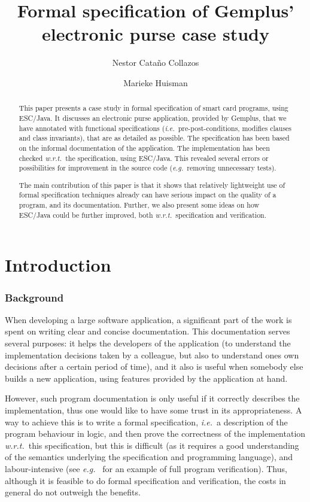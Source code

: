 \documentclass[a4paper]{llncs}
\title{Formal specification of Gemplus' electronic purse case study}
\author{
  Nestor Cata\~no Collazos
\and
  Marieke Huisman
}
\institute{
  INRIA Sophia-Antipolis, France \\ 
  \email{\{Nestor.Catano, Marieke.Huisman\}@sophia.inria.fr}
}
\begin{document}
%

\maketitle


\begin{abstract}
This paper presents a case study in formal specification of smart card
programs, using ESC/Java. It discusses an electronic purse
application, provided by Gemplus, that we have annotated with
functional specifications (\emph{i.e.}~pre-post-conditions, modifies
clauses and class invariants), that are as detailed as possible. The
specification has been based on the informal documentation of the
application. The implementation has been checked \emph{w.r.t.}~the
specification, using ESC/Java.  This revealed several errors or
possibilities for improvement in the source code (\emph{e.g.}~removing
unnecessary tests).

The main contribution of this paper is that it shows that relatively
lightweight use of formal specification techniques already can have
serious impact on the quality of a program, and its
documentation. Further, we also present some ideas on how ESC/Java
could be further improved, both
\emph{w.r.t.}~specification and verification.
\end{abstract}

\section{Introduction}
\label{SectIntro}

\subsubsection{Background}
When developing a large software application, a significant part of
the work is spent on writing clear and concise documentation. This
documentation serves several purposes: it helps the developers of the
application (to understand the implementation decisions taken by a
colleague, but also to understand ones own decisions after a certain
period of time), and it also is useful when somebody else builds a new
application, using features provided by the application at hand.

However, such program documentation is only useful if it correctly
describes the implementation, thus one would like to have some trust
in its appropriateness. A way to achieve this is to write a formal
specification, \emph{i.e.}~a description of the program behaviour in
logic, and then prove the correctness of the implementation
\emph{w.r.t.}~this specification, but this is difficult (as it
requires a good understanding of the semantics underlying the
specification and programming language), and labour-intensive (see
\emph{e.g.}~\cite{HuismanJB00a} for an example of full program
verification). Thus, although it is feasible to do formal
specification and verification, the costs in general do not outweigh
the benefits.
\end{document}
